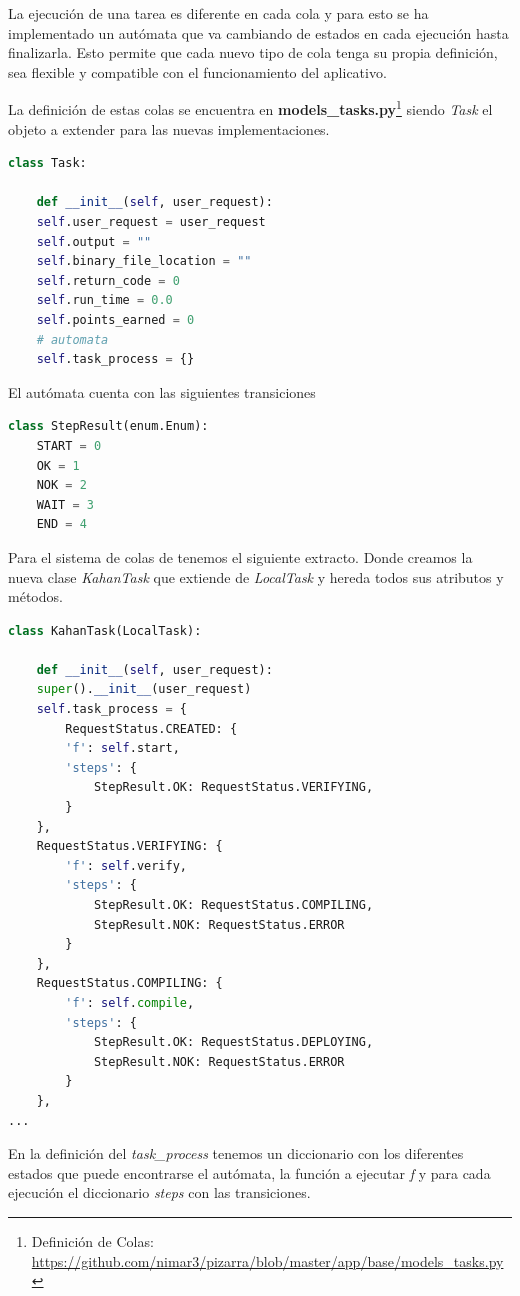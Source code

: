\documentclass[11pt,spanish,listoffigures,listoftables]{tfgetsinf}
\begin{document}
La ejecución de una tarea es diferente en cada \Gls{cola} y para esto se ha implementado un autómata que va cambiando de estados en cada ejecución hasta finalizarla. Esto permite que cada nuevo tipo de \Gls{cola} tenga su propia definición, sea flexible y compatible con el funcionamiento del aplicativo.

La definición de estas \Gls{cola}s se encuentra en \textbf{models\_tasks.py}\footnote{Definición de Colas: \url{https://github.com/nimar3/pizarra/blob/master/app/base/models_tasks.py}} siendo \textit{Task} el objeto a extender para las nuevas implementaciones.

\begin{lstlisting}[language=python]
class Task:

	def __init__(self, user_request):
	self.user_request = user_request
	self.output = ""
	self.binary_file_location = ""
	self.return_code = 0
	self.run_time = 0.0
	self.points_earned = 0
	# automata
	self.task_process = {}
\end{lstlisting}

El autómata cuenta con las siguientes transiciones

\begin{lstlisting}[language=python]
class StepResult(enum.Enum):
	START = 0
	OK = 1
	NOK = 2
	WAIT = 3
	END = 4
\end{lstlisting}

Para el sistema de \Gls{cola}s de \kahan tenemos el siguiente extracto. Donde creamos la nueva clase \textit{KahanTask} que extiende de \textit{LocalTask} y hereda todos sus atributos y métodos.

\begin{lstlisting}[language=python]
class KahanTask(LocalTask):

	def __init__(self, user_request):
	super().__init__(user_request)
	self.task_process = {
		RequestStatus.CREATED: {
		'f': self.start,
		'steps': {
			StepResult.OK: RequestStatus.VERIFYING,
		}
	},
	RequestStatus.VERIFYING: {
		'f': self.verify,
		'steps': {
			StepResult.OK: RequestStatus.COMPILING,
			StepResult.NOK: RequestStatus.ERROR
		}
	},
	RequestStatus.COMPILING: {
		'f': self.compile,
		'steps': {
			StepResult.OK: RequestStatus.DEPLOYING,
			StepResult.NOK: RequestStatus.ERROR
		}
	},
...
\end{lstlisting}

En la definición del \textit{task\_process} tenemos un diccionario con los diferentes estados que puede encontrarse el autómata, la función a ejecutar \textit{f} y para cada ejecución el diccionario \textit{steps} con las transiciones.
\end{document}
